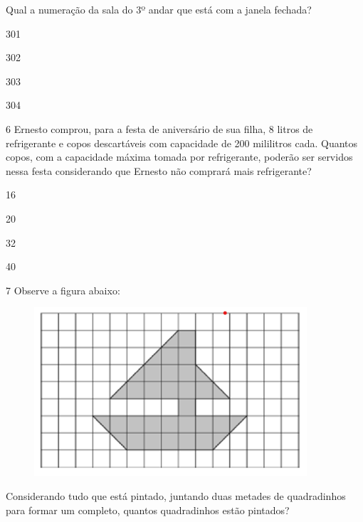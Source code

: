 Qual a numeração da sala do 3º andar que está com a janela fechada?

\begin{minipage}{.5\textwidth}
\begin{escolha}
\item
  301
\item
  302
\item
  303
\item
  304
\end{escolha}
\end{minipage}

\num{6} Ernesto comprou, para a festa de aniversário de sua filha, 
8 litros de refrigerante e copos descartáveis com capacidade de 200
mililitros cada. Quantos copos, com a capacidade máxima tomada por
refrigerante, poderão ser servidos nessa festa considerando que Ernesto 
não comprará mais refrigerante?

\begin{minipage}{.5\textwidth}
\begin{escolha}
\item
  16
\item
  20
\item
  32
\item
  40
\end{escolha}
\end{minipage}

\num{7} Observe a figura abaixo:

\begin{figure}[htpb!]
\includegraphics[width=.5\textwidth]{./imgs/mat19.png}
\end{figure}

Considerando tudo que está pintado, juntando duas metades de quadradinhos 
para formar um completo, quantos quadradinhos estão pintados?

